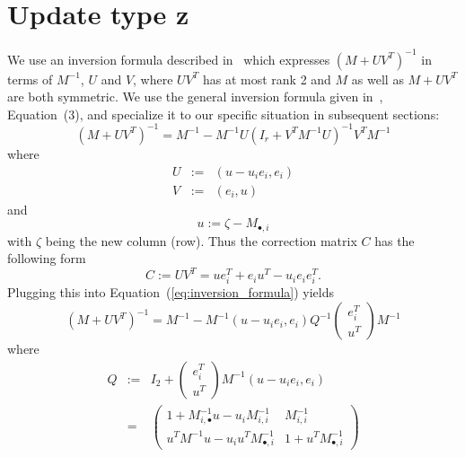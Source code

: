 \documentclass[a4paper]{article}
\begin{document}
\section{Update type z}
We use an inversion formula described in~\cite{Zielke} which expresses $(M +
UV^{T})^{-1}$ in terms of $M^{-1}$, $U$ and $V$, where $UV^{T}$ has at
most rank 2 and $M$ as well as $M+UV^{T}$ are both symmetric.
We use the general inversion formula
given in~\cite{Zielke}, Equation~(3), and specialize it to our specific
situation in subsequent sections:
\begin{equation}
\label{eq:inversion_formula}
\left(M + UV^{T}\right)^{-1} =
M^{-1} - M^{-1} U \left(I_{r} +
V^{T}M^{-1}U\right)^{-1}V^{T}M^{-1}
\end{equation}
where
\begin{eqnarray}
\label{def:U}
U &:=& \left(u- u_{i}e_{i}, e_{i} \right) \\
\label{def:V}
V &:=& \left(e_{i}, u \right)
\end{eqnarray}
and 
\begin{equation}
\label{def:diff_column}
u:=
\zeta
-
M_{\bullet, i}
\end{equation}
with $\zeta$ being the new column (row).
Thus the correction matrix $C$ has the following form
\begin{equation}
C:=UV^{T}=ue_{i}^{T} + e_{i}u^{T} - u_{i}e_{i}e_{i}^{T}.
\end{equation}
Plugging this into Equation~(\ref{eq:inversion_formula}) yields
\begin{equation}
\label{eq:inversion_formula_spec}
\left(M + UV^{T}\right)^{-1} =
M^{-1} - M^{-1}\left(u - u_{i}e_{i}, e_{i}\right)
Q^{-1}
\left(
\begin{array}{c}
e_{i}^{T} \\
\hline
u^{T}
\end{array}
\right)
M^{-1}
\end{equation}
where 
\begin{eqnarray}
Q &:=& I_{2} +
\left(
\begin{array}{c}
e_{i}^{T}  \\
u^{T}
\end{array}
\right)M^{-1}
\left(u - u_{i}e_{i}, e_{i}\right) \\
&=&
\label{def:Q_explicit}
\left(
\begin{array}{cc}
1 + M^{-1}_{i, \bullet}u - u_{i}M_{i,i}^{-1} &
M_{i,i}^{-1} \\
u^{T}M^{-1}u-u_{i}u^{T}M^{-1}_{\bullet, i} &
1 + u^{T}M^{-1}_{\bullet, i}
\end{array}
\right)
\end{eqnarray}
\end{document}
